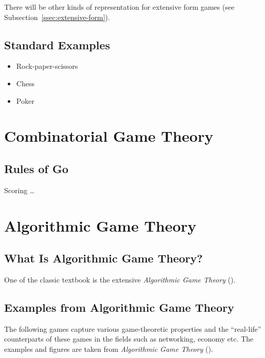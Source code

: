 There will be other kinds of representation for extensive form games (see Subsection~\ref{ssec:extensive-form}).

\subsection{Standard Examples}

\todo %

\begin{itemize}
  \item{Rock-paper-scissors}
  \item{Chess}
  \item{Poker}
\end{itemize}

\section{Combinatorial Game Theory}

\todo

\subsection{Rules of Go}
\label{ssec:rules-Go}

Scoring \dots \todo

\section{Algorithmic Game Theory}

\subsection{What Is Algorithmic Game Theory?}
One of the classic textbook is the extensive \emph{Algorithmic Game Theory} (\cite{AGT07}).
\todo

\subsection{Examples from Algorithmic Game Theory}

The following games capture various game-theoretic properties and the ``real-life'' counterparts of these games in the fields such as networking, economy etc.
The examples and figures are taken from \emph{Algorithmic Game Theory} (\cite{AGT07}).

